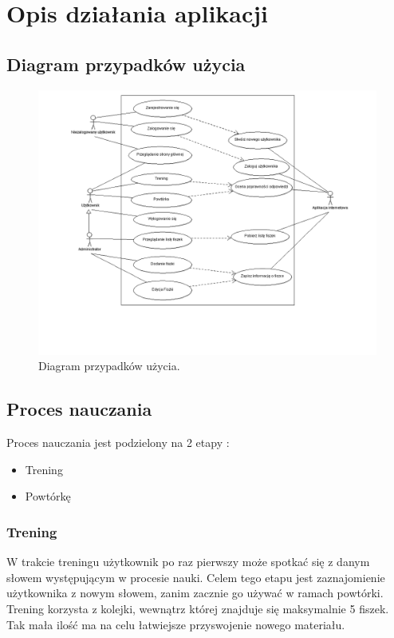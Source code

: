 \newpage
{\let\cleardoublepage\relax \chapter{Opis działania aplikacji}}
\label{cha:main}

\section{Diagram przypadków użycia}

\begin{figure}
	\centering
	\includegraphics[width=\textwidth]{images/usecases.png}
	 \caption{Diagram przypadków użycia.}
\end{figure}


\section{Proces nauczania}

Proces nauczania jest podzielony na 2 etapy :
\begin{itemize}
	\item Trening
	\item Powtórkę
\end{itemize}

\subsection{Trening}

W trakcie treningu użytkownik po raz pierwszy może spotkać się z danym słowem występującym w procesie nauki. Celem tego etapu jest zaznajomienie użytkownika z nowym słowem, zanim zacznie go używać w ramach powtórki.
Trening korzysta z kolejki, wewnątrz której znajduje się maksymalnie 5 fiszek. Tak mała ilość ma na celu łatwiejsze przyswojenie nowego materiału.

